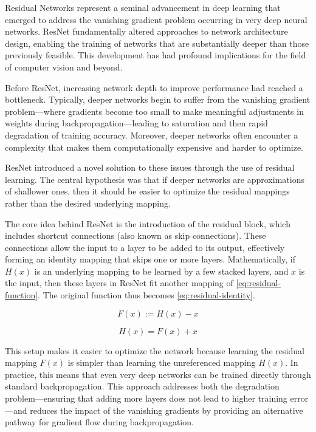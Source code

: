 Residual Networks represent a seminal advancement in deep learning that emerged to address the
vanishing gradient problem occurring in very deep neural networks. ResNet fundamentally altered
approaches to network architecture design, enabling the training of networks that are substantially
deeper than those previously feasible. This development has had profound implications for the field
of computer vision and beyond.

Before ResNet, increasing network depth to improve performance had reached a bottleneck. Typically,
deeper networks begin to suffer from the vanishing gradient problem—where gradients become too small
to make meaningful adjustments in weights during backpropagation—leading to saturation and then
rapid degradation of training accuracy. Moreover, deeper networks often encounter a complexity that
makes them computationally expensive and harder to optimize.

ResNet introduced a novel solution to these issues through the use of residual learning. The central
hypothesis was that if deeper networks are approximations of shallower ones, then it should be
easier to optimize the residual mappings rather than the desired underlying mapping.

The core idea behind ResNet is the introduction of the residual block, which includes shortcut
connections (also known as skip connections). These connections allow the input to a layer to be
added to its output, effectively forming an identity mapping that skips one or more layers.
Mathematically, if $H(x)$ is an underlying mapping to be learned by a few stacked layers, and $x$ is
the input, then these layers in ResNet fit another mapping of \eqref{eq:residual-function}. The
original function thus becomes \eqref{eq:residual-identity}.

\begin{equation}
    F(x) := H(x) - x \label{eq:residual-function}
\end{equation}

\begin{equation}
    H(x) = F(x) + x \label{eq:residual-identity}
\end{equation}

This setup makes it easier to optimize the network because learning the residual mapping $F(x)$ is
simpler than learning the unreferenced mapping $H(x)$. In practice, this means that even very deep
networks can be trained directly through standard backpropagation. This approach addresses both the
degradation problem—ensuring that adding more layers does not lead to higher training error—and
reduces the impact of the vanishing gradients by providing an alternative pathway for gradient flow
during backpropagation.

